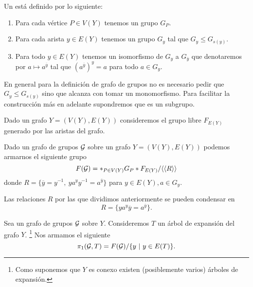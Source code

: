 \documentclass[tesis.tex]{subfiles}
\begin{document}
\begin{deff}
	Un  está definido por lo siguiente:
	\begin{enumerate}
		\item Para cada vértice $P \in V(Y)$ tenemos un grupo $G_P$.
		\item  Para cada arista $y \in E(Y)$ tenemos un grupo $G_y$ tal que $G_y \le G_{s(y)}$.
		\item Para todo $y \in E(Y)$ tenemos un isomorfismo de $G_y$ a $G_{\overline y}$ que denotaremos por $a \mapsto a^{\overline y} $ tal que $(a^{\overline y})^y  = a$ para todo $a \in G_y$.
	\end{enumerate}
\end{deff}

En general para la definición de grafo de grupos no es necesario pedir que $G_y \le G_{s(y)}$ sino que alcanza con tomar un monomorfismo. 
Para facilitar la construcción más en adelante supondremos que es un subgrupo.

Dado un grafo $Y = (V(Y), E(Y))$ consideremos el grupo libre $F_{E(Y)}$ generado por las aristas del grafo.

\begin{deff}
	Dado un grafo de grupos $\cal G$ sobre un grafo $Y = (V(Y), E(Y))$ podemos armarnos el siguiente grupo 
	\begin{equation*}
	F({\cal G}) = \ast_{P \in V(Y)} G_P \ast F_{E(Y)} / \langle \langle  R \rangle \rangle
	\end{equation*}
	donde $R = \{  \overline y = y^{-1}, \ ya^yy^{-1} = a^{\overline y} \}$ para $y \in E(Y), a \in G_y$. 
\end{deff}

\begin{obs}
	Las relaciones $R$ por las que dividimos anteriormente se pueden condensar en 
	\[
	R = \{  ya^y \overline y = a^{\overline y}  \}.
	\]
\end{obs}

\begin{deff} \label{def_pi1_arbol}
	Sea un grafo de grupos $\cal G$ sobre $Y$.
	Consideremos $T$ un árbol de expansión del grafo $Y$.
	\footnote{Como suponemos que $Y$ es conexo existen (posiblemente varios) árboles de expansión.}
	Nos armamos el siguiente 
	\begin{equation*}
		\pi_1({\cal G}, T) = F({\cal G}) / \{ y \  | \ y \in E(T)  \}.
	\end{equation*}
\end{deff}
	
\end{document}
